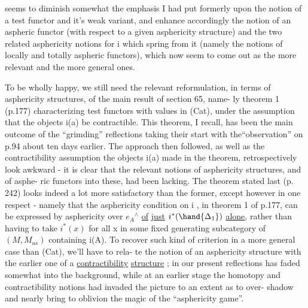 
seems to diminish somewhat the  emphasis I had put formerly upon the
notion of a test functor and it's weak variant, and enhance accordingly
the notion of an aspheric functor (with respect to a given asphericity
structure) and the two related asphericity notions for i which spring
from it (namely the notions of locally and  totally aspheric functors),
which now seem to come out as the more relevant and the more general ones.

To be wholly happy, we still need the relevant reformulation, in
terms of asphericity structures, of the main result of section 65, name-%
ly theorem 1 (p.177) characterizing test functors with values in (Cat),
under the assumption that the objects i(a) be contractible. This theorem,
I recall, has been the main outcome of the ``grimding'' reflections taking
their start with the``observation'' on p.94 about ten days earlier. The
approach then followed, as well as the contractibility assumption  the
objects i(a) made in the theorem, retrospectively look awkward - it is
clear that the relevant notions of asphericity structures, and of asphe-%
ric functors into these, had been lacking. The theorem stated last
(p. 242) looks indeed a lot more satisfactory than the former, except
however in one respect - namely that the asphericity condition on i ,
in theorem 1 of p.177, can be expressed  by asphericity over $e_{A}{}^{\wedge}$ \uline{of}
\uline{just} $i^{*}(\hand{\Delta_{1}})$ \uline{alone}, rather than having to take $i^{*}(x)$ for all x in some
fixed generating subcategory of $(M,M_{as})$ containing i(A). To recover such
kind of  criterion in a more general case than (Cat), we'll have to rela-%
te the notion of an asphericity structure with the earlier one of a
\uline{contractibility} \uline{structure} ;    in our present reflections has faded
somewhat into the background, while at an earlier stage the homotopy and
contractibility notions had invaded the picture to an extent as to over-%
shadow and nearly bring to oblivion the magic of the ``asphericity game''.


